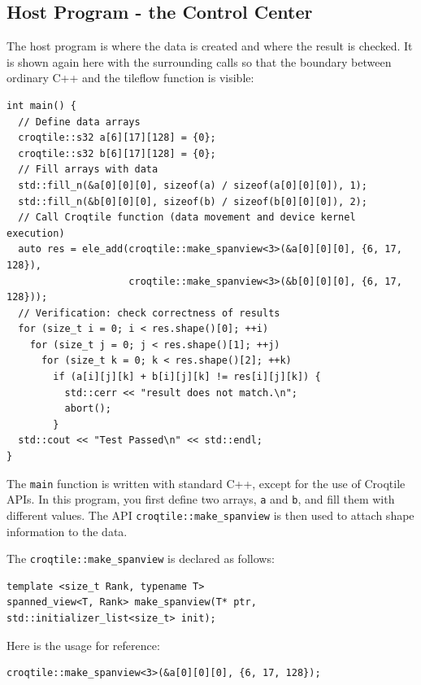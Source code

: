 \subsection*{Host Program - the Control Center}

The host program is where the data is created and where the result is checked. It is shown again here with the surrounding calls so that the boundary between ordinary C++ and the tileflow function is visible:

\begin{lstlisting}[language=croqtile,caption={Host Program - the Control Center}]
int main() {
  // Define data arrays
  croqtile::s32 a[6][17][128] = {0};
  croqtile::s32 b[6][17][128] = {0};
  // Fill arrays with data
  std::fill_n(&a[0][0][0], sizeof(a) / sizeof(a[0][0][0]), 1);
  std::fill_n(&b[0][0][0], sizeof(b) / sizeof(b[0][0][0]), 2);
  // Call Croqtile function (data movement and device kernel execution)
  auto res = ele_add(croqtile::make_spanview<3>(&a[0][0][0], {6, 17, 128}),
                     croqtile::make_spanview<3>(&b[0][0][0], {6, 17, 128}));
  // Verification: check correctness of results
  for (size_t i = 0; i < res.shape()[0]; ++i)
    for (size_t j = 0; j < res.shape()[1]; ++j)
      for (size_t k = 0; k < res.shape()[2]; ++k)
        if (a[i][j][k] + b[i][j][k] != res[i][j][k]) {
          std::cerr << "result does not match.\n";
          abort();
        }
  std::cout << "Test Passed\n" << std::endl;
}
\end{lstlisting}

The \texttt{main} function is written with standard C++, except for the use of Croqtile APIs. In this program, you first define two arrays, \texttt{a} and \texttt{b}, and fill them with different values. The API \texttt{croqtile:\allowbreak{}:\allowbreak{}make\_\allowbreak{}spanview} is then used to attach shape information to the data.

The \texttt{croqtile:\allowbreak{}:\allowbreak{}make\_\allowbreak{}spanview} is declared as follows:

\begin{lstlisting}[language={},caption={Host Program - the Control Center}]
template <size_t Rank, typename T>
spanned_view<T, Rank> make_spanview(T* ptr, std::initializer_list<size_t> init);
\end{lstlisting}

Here is the usage for reference:

\begin{lstlisting}[language={},caption={Host Program - the Control Center}]
croqtile::make_spanview<3>(&a[0][0][0], {6, 17, 128});
\end{lstlisting}

